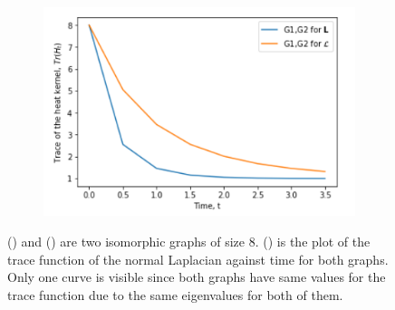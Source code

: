 \documentclass[10pt,a4paper]{article}
\theoremstyle{plain}
\theoremstyle{definition}
\begin{document}
\begin{figure}[H]
\begin{subfigure}[b]{0.35\textwidth}
        		\includegraphics[width= \textwidth]{images/traceplot-isomorphic.png}
        		\caption{}
        		\label{isotracegraphplot}
        	\end{subfigure}
        	\caption{() and ()  are two isomorphic graphs of size $8$. () is the plot of the trace function of the normal Laplacian against time for both graphs. Only one curve is visible since both graphs have same values for the trace function due to the same eigenvalues for both of them. }
        	\label{TraceIsomorphism}
        \end{figure}
        
\end{document}
